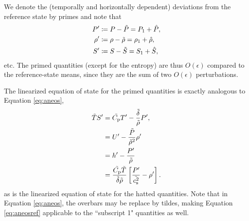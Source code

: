 \documentclass[12pt]{article}
\begin{document}
We denote the (temporally and horizontally dependent) deviations from the reference state by primes and note that 
\begin{align}
	P^\prime & \coloneqq P - \tilde{P} = P_1 + \hat{P},\\
	\rho^\prime & \coloneqq \rho - \tilde{\rho} = \rho_1 + \hat{\rho},\\
	 S^\prime & \coloneqq S -  \tilde{S} =  S_1 + \hat{S},
\end{align}
etc. The primed quantities (except for the entropy) are thus $O(\epsilon)$ compared to the reference-state means, since they are the sum of two $O(\epsilon)$ perturbations. 

The linearized equation of state for the primed quantities is exactly analogous to Equation \eqref{eq:aneos},
\begin{subequations}\label{eq:aneosref}
	\begin{align}
		\tilde{T} S^\prime &= \tilde{C_{\rm{p}}} T^\prime - \frac{\tilde{\delta}}{\tilde{\rho}} P^\prime,\\
  	&= U^\prime - \frac{\tilde{P}}{\tilde{\rho}^2}\rho^\prime \label{eq:linuref}\\
&= h^\prime - \frac{P^\prime}{\tilde{\rho}}\\
		&= \frac{\tilde{C_{\rm{p}}} \tilde{T}}{\tilde{\delta}\tilde{\rho}}\left[\frac{P^\prime}{\tilde{c_{\rm s}^2}}-\rho^\prime\right].
	\end{align}
\end{subequations}
as is the linearized equation of state for the hatted quantities. Note that in Equation \eqref{eq:aneos}, the overbars may be replace by tildes, making Equation \eqref{eq:aneosref} applicable to the ``subscript 1" quantities as well. 
\end{document}
